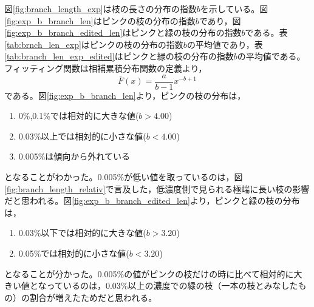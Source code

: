 \documentclass[autodetect-engine,dvi=dvipdfmx,a4paper,ja=standard,oneside,openany,11pt,draft]{bxjsbook}
\begin{document}
図\ref{fig:branch_length_exp}は枝の長さの分布の指数$b$を示している。図\ref{fig:exp_b_branch_len}はピンクの枝の分布の指数$b$であり，図\ref{fig:exp_b_branch_edited_len}はピンクと緑の枝の分布の指数$b$である。表\ref{tab:brnch_len_exp}はピンクの枝の分布の指数$b$の平均値であり，表\ref{tab:branch_len_exp_edited}はピンクと緑の枝の分布の指数$b$の平均値である。フィッティング関数は相補累積分布関数の定義より，
\begin{equation}
  \bar{F}(x) = \frac{a}{b-1}x^{-b+1}
  \label{eq:complementary_cumulative}
\end{equation}
である。図\ref{fig:exp_b_branch_len}より，ピンクの枝の分布は，
\begin{enumerate}
  \item 0\%,0.1\%では相対的に大きな値($b>4.00$)
  \item 0.03\%以上では相対的に小さな値($b<4.00$)
  \item 0.005\%は傾向から外れている
\end{enumerate}
となることがわかった。0.005\%が低い値を取っているのは，図\ref{fig:branch_length_relativ}で言及した，低濃度側で見られる極端に長い枝の影響だと思われる。図\ref{fig:exp_b_branch_edited_len}より，ピンクと緑の枝の分布は，
\begin{enumerate}
  \item 0.03\%以下では相対的に大きな値($b>3.20$)
  \item 0.05\%では相対的に小さな値($b<3.20$)
\end{enumerate}
となることが分かった。0.005\%の値がピンクの枝だけの時に比べて相対的に大きい値となっているのは，0.03\%以上の濃度での緑の枝（一本の枝とみなしたもの）の割合が増えたためだと思われる。
\ifdraft{
  
  
}{}
\end{document}

